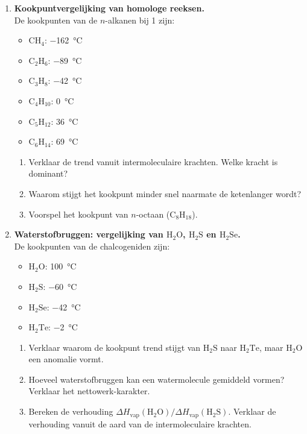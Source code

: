 \begin{enumerate}

\item \textbf{Kookpuntvergelijking van homologe reeksen.} \\
De kookpunten van de $n$-alkanen bij \SI{1}{\atm} zijn:
\begin{itemize}
\item $\mathrm{CH_4}$: \SI{-162}{\celsius}
\item $\mathrm{C_2H_6}$: \SI{-89}{\celsius}
\item $\mathrm{C_3H_8}$: \SI{-42}{\celsius}
\item $\mathrm{C_4H_{10}}$: \SI{0}{\celsius}
\item $\mathrm{C_5H_{12}}$: \SI{36}{\celsius}
\item $\mathrm{C_6H_{14}}$: \SI{69}{\celsius}
\end{itemize}
\begin{enumerate}
\item[(a)] Verklaar de trend vanuit intermoleculaire krachten. Welke kracht is dominant?
\item[(b)] Waarom stijgt het kookpunt minder snel naarmate de ketenlanger wordt?
\item[(c)] Voorspel het kookpunt van $n$-octaan ($\mathrm{C_8H_{18}}$).
\end{enumerate}

\item \textbf{Waterstofbruggen: vergelijking van $\mathrm{H_2O}$, $\mathrm{H_2S}$ en $\mathrm{H_2Se}$.} \\
De kookpunten van de chalcogeniden zijn:
\begin{itemize}
\item $\mathrm{H_2O}$: \SI{100}{\celsius}
\item $\mathrm{H_2S}$: \SI{-60}{\celsius}
\item $\mathrm{H_2Se}$: \SI{-42}{\celsius}
\item $\mathrm{H_2Te}$: \SI{-2}{\celsius}
\end{itemize}
\begin{enumerate}
\item[(a)] Verklaar waarom de kookpunt trend stijgt van $\mathrm{H_2S}$ naar $\mathrm{H_2Te}$, maar $\mathrm{H_2O}$ een anomalie vormt.
\item[(b)] Hoeveel waterstofbruggen kan een watermolecule gemiddeld vormen? Verklaar het nettowerk-karakter.
\item[(c)] Bereken de verhouding $\Delta H_{\text{vap}}(\mathrm{H_2O})/\Delta H_{\text{vap}}(\mathrm{H_2S})$. Verklaar de verhouding vanuit de aard van de intermoleculaire krachten.
\end{enumerate}


\end{enumerate}
